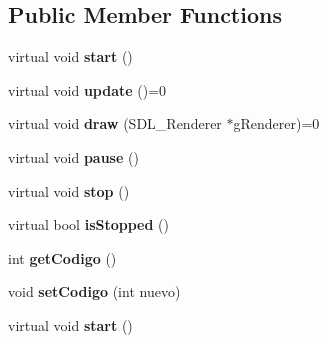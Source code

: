 \subsection*{Public Member Functions}
\begin{DoxyCompactItemize}
\item 
virtual void {\bfseries start} ()\hypertarget{class_simple_animacion_aacfc84236655f3752dd10710731855ab}{}\label{class_simple_animacion_aacfc84236655f3752dd10710731855ab}

\item 
virtual void {\bfseries update} ()=0\hypertarget{class_simple_animacion_a49ac1ea0fc728d1782f944f2af8c0b91}{}\label{class_simple_animacion_a49ac1ea0fc728d1782f944f2af8c0b91}

\item 
virtual void {\bfseries draw} (S\+D\+L\+\_\+\+Renderer $\ast$g\+Renderer)=0\hypertarget{class_simple_animacion_a95e4bc58cbcb479e1ae0507333aab95f}{}\label{class_simple_animacion_a95e4bc58cbcb479e1ae0507333aab95f}

\item 
virtual void {\bfseries pause} ()\hypertarget{class_simple_animacion_a252896da7acf3a42fb3b97ee45a4f7fb}{}\label{class_simple_animacion_a252896da7acf3a42fb3b97ee45a4f7fb}

\item 
virtual void {\bfseries stop} ()\hypertarget{class_simple_animacion_a895609b606404d07dfa35b1067e7c185}{}\label{class_simple_animacion_a895609b606404d07dfa35b1067e7c185}

\item 
virtual bool {\bfseries is\+Stopped} ()\hypertarget{class_simple_animacion_ad9c59cd0edad45c5a32d8453e6b3d34c}{}\label{class_simple_animacion_ad9c59cd0edad45c5a32d8453e6b3d34c}

\item 
int {\bfseries get\+Codigo} ()\hypertarget{class_simple_animacion_a8204b7fc4e5dd0140a7eb83de09c8315}{}\label{class_simple_animacion_a8204b7fc4e5dd0140a7eb83de09c8315}

\item 
void {\bfseries set\+Codigo} (int nuevo)\hypertarget{class_simple_animacion_a1e2efb425a063bb072a5a45de30720df}{}\label{class_simple_animacion_a1e2efb425a063bb072a5a45de30720df}

\item 
virtual void {\bfseries start} ()\hypertarget{class_simple_animacion_aacfc84236655f3752dd10710731855ab}{}\label{class_simple_animacion_aacfc84236655f3752dd10710731855ab}


\end{DoxyCompactItemize}
